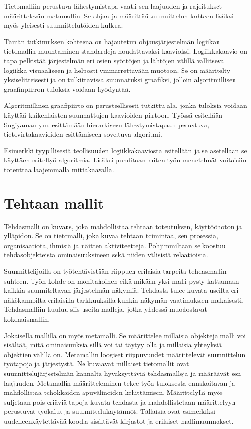 \documentclass[finnish,12pt]{article}
\begin{document}
Tietomalliin perustuva lähestymistapa vaatii sen laajuuden ja rajoitukset määrittelevän metamallin.
Se ohjaa ja määrittää suunnittelun kohteen lisäksi myös yleisesti suunnittelutöiden kulkua.

Tämän tutkimuksen kohteena on hajautetun ohjausjärjestelmän logiikan tietomallin muuntaminen standardeja noudattavaksi kaavioksi.
Logiikkakaavio on tapa pelkistää järjestelmän eri osien syöttöjen ja lähtöjen välillä vallitseva logiikka visuaaliseen ja helposti ymmärrettävään muotoon.
Se on määritelty yksiselitteisesti ja on tulkittavissa suunnatuksi graafiksi, jolloin algoritmillisen graafinpiirron tuloksia voidaan hyödyntää.

Algoritmillinen graafipiirto on perusteellisesti tutkittu ala, jonka tuloksia voidaan käyttää kaikenlaisten suunnattujen kaavioiden piirtoon.
Työssä esitellään Sugiyaman ym. \cite{RefWorks:9} esittämään hierarkiseen lähestymistapaan perustuva, tietovirtakaavioiden esittämiseen soveltuva algoritmi.

Esimerkki tyypillisestä teollisuuden logiikkakaaviosta esitellään ja se asetellaan se käyttäen esiteltyä algoritmia.
Lisäksi pohditaan miten työn menetelmät voitaisiin toteuttaa laajemmalla mittakaavalla.

	\clearpage
	\section{Tehtaan mallit}

Tehdasmalli on kuvaus, joka mahdollistaa tehtaan toteutuksen, käyttöönoton ja ylläpidon. Se on tietomalli, joka kuvaa tehtaan toimintaa, sen prosessia, organisaatiota, ihmisiä ja näitten aktiviteetteja.
Pohjimmiltaan se koostuu tehdasobjekteista ominaisuuksineen sekä niiden välisistä relaatioista. \cite{RefWorks:41}

Suunnittelijoilla on työtehtävistään riippuen erilaisia tarpeita tehdasmallin suhteen.
Työn kohde on monitahoinen eikä mikään yksi malli pysty kattamaan kaikkia suunniteltavan järjestelmän näkymiä.
Tehdasta tulee kuvata useilta eri näkökannoilta erilaisilla tarkkuuksilla kunkin näkymän vaatimuksien mukaisesti.
Tehdasmalliin kuuluu siis useita malleja, jotka yhdessä muodostavat kokonaismallin.

Jokaisella mallilla on myös metamalli. Se määrittelee millaisia objekteja malli voi sisältää, mitä ominaisuuksia sillä voi tai täytyy olla ja millaisia yhteyksiä objektien välillä on.
Metamallin loogiset riippuvuudet määrittelevät suunnittelun työtapoja ja järjestystä.
Ne kuvaavat millaiset tietomallit ovat suunnittelujärjestelmän kannalta hyväksyttäviä tehdasmalleja ja
määräävät sen laajuuden. Metamallin määritteleminen tekee työn tuloksesta ennakoitavan ja mahdollistaa tehokkaiden apuvälineiden kehittämisen.
Määrittelyllä myös suljetaan pois eriäviä tapoja kuvata tehdasta ja mahdollistetaan määrittelyyn perustuvat työkalut ja suunnittelukäytännöt.
Tällaisia ovat esimerkiksi uudelleenkäytettävää koodia sisältävät kirjastot ja erilaiset mallimuunnokset.
\end{document}
